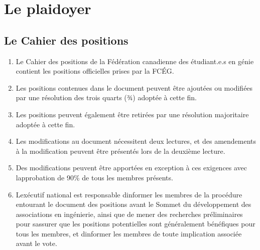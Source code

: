 \section{Le plaidoyer}
\label{le-plaidoyer}

\subsection{Le Cahier des positions}
\label{le-cahier-des-positions}

\begin{enumerate}
 \item
  Le Cahier des positions de la Fédération canadienne des étudiant.e.s en génie contient les positions officielles prises par la FCÉG.
 \item
  Les positions contenues dans le document peuvent être ajoutées ou modifiées par une résolution des trois quarts (3⁄4) adoptée à cette fin.
 \item
  Les positions peuvent également être retirées par une résolution majoritaire adoptée à cette fin.
 \item
  Les modifications au document nécessitent deux lectures, et des amendements à la modification peuvent être présentés lors de la deuxième lecture.
 \item
  Des modifications peuvent être apportées en exception à ces exigences avec l\textquotesingle approbation de 90\% de tous les membres présents.
 \item
  L\textquotesingle exécutif national est responsable d\textquotesingle informer les membres de la procédure entourant le document des positions avant le Sommet du développement des associations en ingénierie, ainsi que de mener des recherches préliminaires pour s\textquotesingle assurer que les positions potentielles sont généralement bénéfiques pour tous les membres, et d\textquotesingle informer les membres de toute implication associée avant le vote.
\end{enumerate}

